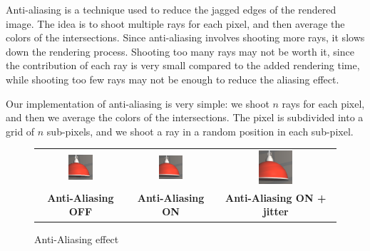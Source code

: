 \documentclass[tikz,14pt,fleqn]{article}
\begin{document}
Anti-aliasing is a technique used to reduce the jagged edges of the rendered image.
The idea is to shoot multiple rays for each pixel, and then average the colors of the intersections.
Since anti-aliasing involves shooting more rays, it slows down the rendering process.
Shooting too many rays may not be worth it, since the contribution of each ray is very small compared to the added rendering time, while shooting too few rays may not be enough to reduce the aliasing effect.

Our implementation of anti-aliasing is very simple: we shoot $n$ rays for each pixel, and then we average the colors of the intersections. 
The pixel is subdivided into a grid of $n$ sub-pixels, and we shoot a ray in a random position in each sub-pixel.


\begin{figure}[H]
    \centering
    \begin{tabular}{ccc}
    \includegraphics[width=0.3\textwidth]{fig/anti-aliasing-OFF.png} & 
    \includegraphics[width=0.3\textwidth]{fig/anti-aliasing-ON.png} &
    \includegraphics[width=0.3\textwidth]{fig/anti-aliasing-ON-jittered.png} \\
    \textbf{Anti-Aliasing OFF} & \textbf{Anti-Aliasing ON} & \textbf{Anti-Aliasing ON + jitter}  \\
    \end{tabular}
    \caption{Anti-Aliasing effect}
    \label{fig:antialiasing}
\end{figure}
\end{document}
